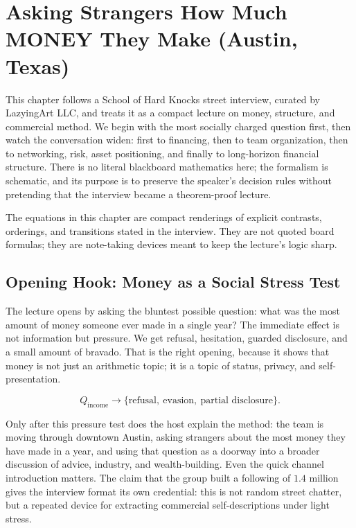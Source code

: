 \chapter{Asking Strangers How Much MONEY They Make (Austin, Texas)}

This chapter follows a School of Hard Knocks street interview, curated by LazyingArt LLC, and treats it as a compact lecture on money, structure, and commercial method. We begin with the most socially charged question first, then watch the conversation widen: first to financing, then to team organization, then to networking, risk, asset positioning, and finally to long-horizon financial structure. There is no literal blackboard mathematics here; the formalism is schematic, and its purpose is to preserve the speaker's decision rules without pretending that the interview became a theorem-proof lecture.

\begin{remark}
The equations in this chapter are compact renderings of explicit contrasts, orderings, and transitions stated in the interview. They are not quoted board formulas; they are note-taking devices meant to keep the lecture's logic sharp.
\end{remark}

\section{Opening Hook: Money as a Social Stress Test}

The lecture opens by asking the bluntest possible question: what was the most amount of money someone ever made in a single year? The immediate effect is not information but pressure. We get refusal, hesitation, guarded disclosure, and a small amount of bravado. That is the right opening, because it shows that money is not just an arithmetic topic; it is a topic of status, privacy, and self-presentation.

\begin{equation}
Q_{\mathrm{income}} \longrightarrow \{\text{refusal},\ \text{evasion},\ \text{partial disclosure}\}.
\end{equation}

Only after this pressure test does the host explain the method: the team is moving through downtown Austin, asking strangers about the most money they have made in a year, and using that question as a doorway into a broader discussion of advice, industry, and wealth-building. Even the quick channel introduction matters. The claim that the group built a following of \(1.4\) million gives the interview format its own credential: this is not random street chatter, but a repeated device for extracting commercial self-descriptions under light stress.

